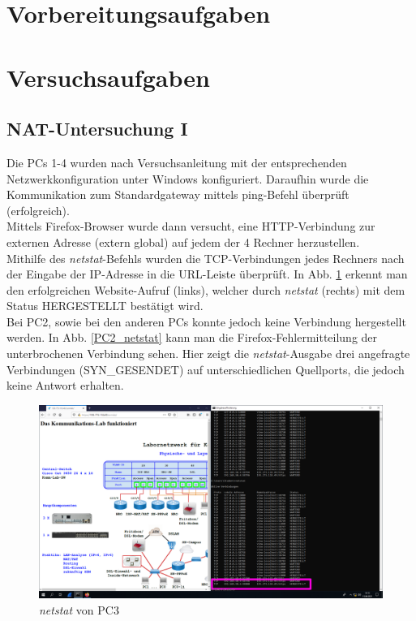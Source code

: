 \documentclass[11pt, a4paper]{article}
\newcommand{\cmd}[1]{\textit{#1}}
\begin{document}


\section{Vorbereitungsaufgaben}



\section{Versuchsaufgaben}
\subsection{NAT-Untersuchung I}

Die PCs 1-4 wurden nach Versuchsanleitung mit der entsprechenden
Netzwerkkonfiguration unter Windows konfiguriert. Daraufhin wurde die
Kommunikation zum Standardgateway mittels ping-Befehl überprüft (erfolgreich).\\

Mittels Firefox-Browser wurde dann versucht, eine HTTP-Verbindung zur externen
Adresse  (extern global) auf jedem der 4 Rechner
herzustellen.\\

Mithilfe des \cmd{netstat}-Befehls wurden die TCP-Verbindungen jedes Rechners
nach der Eingabe der IP-Adresse in die URL-Leiste überprüft. In Abb.
\ref{PC3_netstat} erkennt man den erfolgreichen Website-Aufruf (links), welcher
durch \cmd{netstat} (rechts) mit dem Status HERGESTELLT bestätigt wird.\\

Bei PC2, sowie bei den anderen PCs konnte jedoch keine Verbindung hergestellt
werden. In Abb. \ref{PC2_netstat} kann man die Firefox-Fehlermitteilung der
unterbrochenen Verbindung sehen. Hier zeigt die \cmd{netstat}-Ausgabe drei
angefragte Verbindungen (SYN\_GESENDET) auf unterschiedlichen Quellports,
die jedoch keine Antwort erhalten.\\

\begin{figure}[H]
  \centering
  \includegraphics[width=\textwidth]
  {graphics/bilder/31/PC_3_zweiterversuch_verbunden}
  \caption{\emph{netstat} von PC3}\label{PC3_netstat}
\end{figure}
\end{document}
